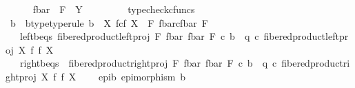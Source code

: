 \begin{isabellebody}
\ \ \ \ \isamarkupfalse%
\ {\isachardoublequoteopen}f{\isacharunderscore}{\kern0pt}bar\ {\isacharcolon}{\kern0pt}\ F\ {\isasymrightarrow}\ Y{\isachardoublequoteclose}\ \isanewline
\ \ \ \ \ \ \isamarkupfalse%
\ typecheck{\isacharunderscore}{\kern0pt}cfuncs\isanewline
\ \ \isamarkupfalse%
\isanewline
\isanewline
\ \ \isanewline
\ \ \isanewline
\ \ \isamarkupfalse%
\ \isamarkupfalse%
\ b\ \ b{\isacharunderscore}{\kern0pt}type{\isacharbrackleft}{\kern0pt}type{\isacharunderscore}{\kern0pt}rule{\isacharbrackright}{\kern0pt}{\isacharcolon}{\kern0pt}\ {\isachardoublequoteopen}b\ {\isacharcolon}{\kern0pt}\ X\ \isactrlbsub f\isactrlesub {\isasymtimes}\isactrlsub c\isactrlbsub f\isactrlesub \ X\ {\isasymrightarrow}\ F\ \isactrlbsub {\isacharparenleft}{\kern0pt}f{\isacharunderscore}{\kern0pt}bar{\isacharparenright}{\kern0pt}\isactrlesub {\isasymtimes}\isactrlsub c\isactrlbsub {\isacharparenleft}{\kern0pt}f{\isacharunderscore}{\kern0pt}bar{\isacharparenright}{\kern0pt}\isactrlesub \ F{\isachardoublequoteclose}\ \isanewline
\ \ \ left{\isacharunderscore}{\kern0pt}b{\isacharunderscore}{\kern0pt}eqs{\isacharcolon}{\kern0pt}\ {\isachardoublequoteopen}fibered{\isacharunderscore}{\kern0pt}product{\isacharunderscore}{\kern0pt}left{\isacharunderscore}{\kern0pt}proj\ F\ {\isacharparenleft}{\kern0pt}f{\isacharunderscore}{\kern0pt}bar{\isacharparenright}{\kern0pt}\ {\isacharparenleft}{\kern0pt}f{\isacharunderscore}{\kern0pt}bar{\isacharparenright}{\kern0pt}\ F\ {\isasymcirc}\isactrlsub c\ b\ {\isacharequal}{\kern0pt}\ q\ {\isasymcirc}\isactrlsub c\ fibered{\isacharunderscore}{\kern0pt}product{\isacharunderscore}{\kern0pt}left{\isacharunderscore}{\kern0pt}proj\ X\ f\ f\ X{\isachardoublequoteclose}\ \isanewline
\ \ \ right{\isacharunderscore}{\kern0pt}b{\isacharunderscore}{\kern0pt}eqs{\isacharcolon}{\kern0pt}\ \ {\isachardoublequoteopen}fibered{\isacharunderscore}{\kern0pt}product{\isacharunderscore}{\kern0pt}right{\isacharunderscore}{\kern0pt}proj\ F\ {\isacharparenleft}{\kern0pt}f{\isacharunderscore}{\kern0pt}bar{\isacharparenright}{\kern0pt}\ {\isacharparenleft}{\kern0pt}f{\isacharunderscore}{\kern0pt}bar{\isacharparenright}{\kern0pt}\ F\ {\isasymcirc}\isactrlsub c\ b\ {\isacharequal}{\kern0pt}\ q\ {\isasymcirc}\isactrlsub c\ fibered{\isacharunderscore}{\kern0pt}product{\isacharunderscore}{\kern0pt}right{\isacharunderscore}{\kern0pt}proj\ X\ f\ f\ X{\isachardoublequoteclose}\ \isanewline
\ \ \ epi{\isacharunderscore}{\kern0pt}b{\isacharcolon}{\kern0pt}\ {\isachardoublequoteopen}epimorphism\ b{\isachardoublequoteclose}\isanewline

\end{isabellebody}
